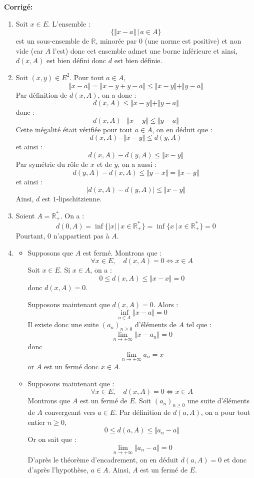 \documentclass[a4paper,twoside,french,11pt]{VcCours}
\newcommand{\corr}{\textbf{Corrigé:}}
\begin{document}
\corr 

\begin{enumerate}
\item Soit $x \in E$. L'ensemble :
$$ \lbrace \Vert x- a \Vert \, \vert \, a \in A \rbrace$$
est un sous-ensemble de $\mathbb{R}$, minorée par $0$ (une norme est positive) et non vide (car $A$ l'est) donc cet ensemble admet une borne inférieure et ainsi, $d(x,A)$ est bien défini donc $d$ est bien définie.
\item Soit $(x,y) \in E^2$. Pour tout $a \in A$,
$$ \Vert x-a \Vert = \Vert x-y+y-a \Vert \leq \Vert x-y \Vert + \Vert y-a \Vert$$
Par définition de $d(x,A)$, on a donc :
$$ d(x,A) \leq \Vert x-y \Vert + \Vert y-a \Vert$$
donc :
$$ d(x,A) - \Vert x-y \Vert \leq \Vert y-a \Vert$$
Cette inégalité était vérifiée pour tout $a \in A$, on en déduit que :
$$ d(x,A) - \Vert x-y \Vert \leq d(y,A)$$
et ainsi :
$$ d(x,A)-d(y,A) \leq \Vert x-y \Vert$$
Par symétrie du rôle de $x$ et de $y$, on a aussi :
$$  d(y,A)-d(x,A) \leq \Vert y-x \Vert = \Vert x-y \Vert$$
et ainsi :
$$ \vert d(x,A)-d(y,A) \vert \leq \Vert x-y \Vert$$
Ainsi, $d$ est $1$-lipschitzienne.
\item Soient $A= \mathbb{R}_+^{*}$. On a :
$$ d(0,A) = \inf \lbrace \vert x \vert \, \vert \, x \in \mathbb{R}_+^* \rbrace = \inf \lbrace x \, \vert \, x \in \mathbb{R}_+^* \rbrace = 0$$
Pourtant, $0$ n'appartient pas à $A$.
\item 

\begin{itemize}
\item Supposons que $A$ est fermé. Montrons que :
$$ \forall x \in E, \quad d(x,A)=0 \Longleftrightarrow x \in A $$
Soit $x \in E$. Si $x \in A$, on a :
$$ 0 \leq d(x,A) \leq \Vert x-x\Vert = 0$$
donc $d(x,A)=0$.


Supposons maintenant que $d(x,A)=0$. Alors :
$$ \inf_{a \in A} \Vert x- a \Vert = 0$$
Il existe donc une suite $(a_n)_{n \geq 0}$ d'éléments de $A$ tel que :
$$ \lim_{n \rightarrow + \infty} \Vert x-a_n \Vert = 0$$
donc 
$$ \lim_{n \rightarrow + \infty} a_n = x$$
or $A$ est un fermé donc $x\in A$.
\item Supposons maintenant que :
$$  \forall x \in E, \quad d(x,A)=0 \Longleftrightarrow x \in A $$
Montrons que $A$ est un fermé de $E$. Soit $(a_n)_{n \geq 0}$ une suite d'éléments de $A$ convergeant vers $a \in E$. Par définition de $d(a,A)$, on a pour tout entier $n \geq 0$,
$$0 \leq d(a,A) \leq \Vert a_n -a \Vert$$
Or on sait que :
$$ \lim_{n \rightarrow + \infty} \Vert a_n -a \Vert = 0$$
D'après le théorème d'encadrement, on en déduit $d(a,A)=0$ et donc d'après l'hypothèse, $a \in A$. Ainsi, $A$ est un fermé de $E$.
\end{itemize}
\end{enumerate}
\end{document}
